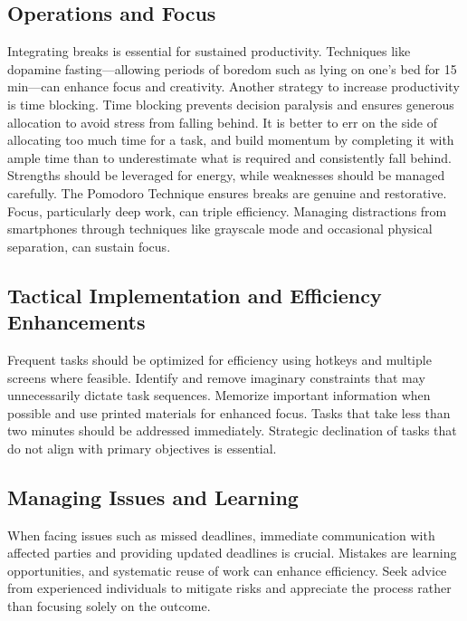 \subsection{Operations and Focus}

Integrating breaks is essential for sustained productivity.
Techniques like dopamine fasting---allowing periods of boredom such as lying on one's bed for 15 min---can enhance focus and creativity.
Another strategy to increase productivity is time blocking.
Time blocking prevents decision paralysis and ensures generous allocation to avoid stress from falling behind.
It is better to err on the side of allocating too much time for a task, and build momentum by completing it with ample time than to underestimate what is required and consistently fall behind.
Strengths should be leveraged for energy, while weaknesses should be managed carefully.
The Pomodoro Technique ensures breaks are genuine and restorative.
Focus, particularly deep work, can triple efficiency.
Managing distractions from smartphones through techniques like grayscale mode and occasional physical separation, can sustain focus.

\subsection{Tactical Implementation and Efficiency Enhancements}

Frequent tasks should be optimized for efficiency using hotkeys and multiple screens where feasible.
Identify and remove imaginary constraints that may unnecessarily dictate task sequences.
Memorize important information when possible and use printed materials for enhanced focus.
Tasks that take less than two minutes should be addressed immediately.
Strategic declination of tasks that do not align with primary objectives is essential.

\subsection{Managing Issues and Learning}

When facing issues such as missed deadlines, immediate communication with affected parties and providing updated deadlines is crucial.
Mistakes are learning opportunities, and systematic reuse of work can enhance efficiency.
Seek advice from experienced individuals to mitigate risks and appreciate the process rather than focusing solely on the outcome.
